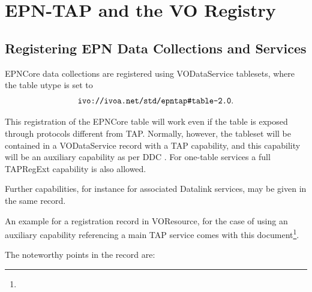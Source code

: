\documentclass[11pt,a4paper]{ivoa}
\begin{document}
\section{EPN-TAP and the VO Registry}
\label{sect:registry}

\subsection{Registering EPN Data Collections and Services}

EPNCore data collections are registered using VODataService
\citep{2010ivoa.spec.1202P} tablesets, where the table utype is set to
$$\hbox{\verb|ivo://ivoa.net/std/epntap#table-2.0|}.$$

This registration of the EPNCore table will work even if the table is
exposed through protocols different from TAP.  Normally, however, the
tableset will be contained in a VODataService 
record with a TAP capability, and this capability will be an auxiliary
capability as per DDC \citep{2019ivoa.rept.0520D}.  For one-table
services a full TAPRegExt \citep{2012ivoa.spec.0827D} capability is also
allowed.

Further capabilities, for instance for associated Datalink services,
may be given in the same record.

An example for a registration record in VOResource, for the case of
using an auxiliary capability referencing a main TAP service comes with
this document\footnote{}.

The noteworthy points in the record are:
\end{document}
